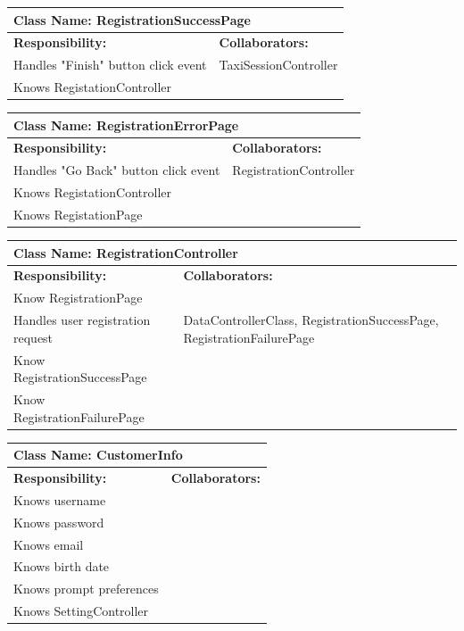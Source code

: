 \documentclass[]{article}
\begin{document}
	\begin{table}[H]
	\centering
	\begin{tabular}{|p{6cm}|p{6cm}|}
	\hline 
		\multicolumn{2}{|l|}{\textbf{Class Name: RegistrationSuccessPage}} \\
	\hline
	\textbf{Responsibility:} & \textbf{Collaborators:} \\
	\hline 
	Handles "Finish" button click event  & TaxiSessionController\\ \hline 
	Knows RegistationController &\\ \hline
	\end{tabular}
	\end{table}
	
	\begin{table}[H]
	\centering
	\begin{tabular}{|p{6cm}|p{6cm}|}
	\hline 
		\multicolumn{2}{|l|}{\textbf{Class Name: RegistrationErrorPage}} \\
	\hline
	\textbf{Responsibility:} & \textbf{Collaborators:} \\
	\hline 
	Handles "Go Back" button click event  & RegistrationController\\ \hline 
	Knows RegistationController &\\ \hline
	Knows RegistationPage &\\ \hline
	\end{tabular}
	\end{table}
		
	\begin{table}[H]
	\centering
	\begin{tabular}{|p{6cm}|p{6cm}|}
	\hline 
		\multicolumn{2}{|l|}{\textbf{Class Name: RegistrationController}} \\
	\hline
	\textbf{Responsibility:} & \textbf{Collaborators:} \\
	\hline
	Know RegistrationPage&\\ \hline
	Handles user registration request & DataControllerClass, RegistrationSuccessPage, RegistrationFailurePage\\ \hline
	Know RegistrationSuccessPage &\\ \hline
	Know RegistrationFailurePage &\\ \hline
	\end{tabular}
	\end{table}
	
	\begin{table}[H]
	\centering
	\begin{tabular}{|p{6cm}|p{6cm}|}
	\hline 
		\multicolumn{2}{|l|}{\textbf{Class Name: CustomerInfo}} \\
	\hline
	\textbf{Responsibility:} & \textbf{Collaborators:} \\
	\hline 
	Knows username&\\ \hline
	Knows password&\\ \hline 
	Knows email&\\ \hline 
	Knows birth date&\\ \hline 
	Knows prompt preferences &\\ \hline
	Knows SettingController &\\ \hline
	\end{tabular}
	\end{table}
		
\end{document}
